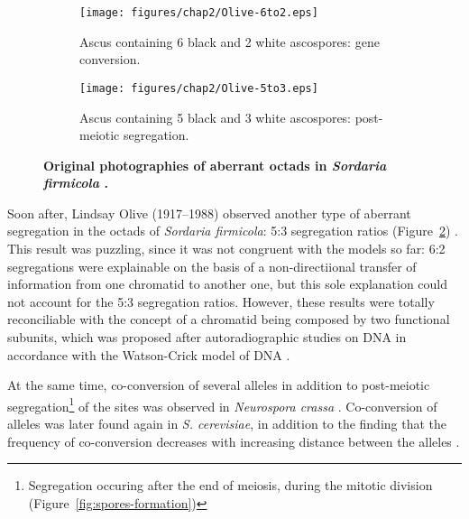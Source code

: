 \begin{figure}[h]
	\centering
	\begin{subfigure}[b]{\textwidth}
		\texttt{[image: figures/chap2/Olive-6to2.eps]}
		\caption{Ascus containing 6 black and 2 white ascospores: gene conversion.}
\label{fig:sub-olive-6to2}
	\end{subfigure}

	\begin{subfigure}[b]{\textwidth}
		\texttt{[image: figures/chap2/Olive-5to3.eps]}
		\caption{Ascus containing 5 black and 3 white ascospores: post-meiotic segregation.}
\label{fig:sub-olive-5to3}
	\end{subfigure}

	\caption[Original photographies of aberrant octads in \textit{Sordaria firmicola} \citep{olive1959aberrant}]
	{\textbf{Original photographies of aberrant octads in \textit{Sordaria firmicola} \citep{olive1959aberrant}.}
	}
\label{fig:olive-octads}
\end{figure}


Soon after, Lindsay Olive (1917--1988) observed another type of aberrant segregation in the octads of \textit{Sordaria firmicola}: 5:3 segregation ratios (Figure~\ref{fig:sub-olive-5to3}) \citep{olive1959aberrant, kitani1962genetics}.
This result was puzzling, since it was not congruent with the models so far: 6:2 segregations were explainable on the basis of a non-directiional transfer of information from one chromatid to another one, but this sole explanation could not account for the 5:3 segregation ratios. 
However, these results were totally reconciliable with the concept of a chromatid being composed by two functional subunits, which was proposed after autoradiographic studies on DNA \citep{taylor1957organization} in accordance with the Watson-Crick model of DNA \citep{watson1953molecular}.

At the same time, co-conversion of several alleles in addition to post-meiotic segregation\footnote{Segregation occuring after the end of meiosis, during the mitotic division (Figure~\ref{fig:spores-formation})} of the sites was observed in \textit{Neurospora crassa} \citep{case1964allelic}. Co-conversion of alleles was later found again in \textit{S. cerevisiae}, in addition to the finding that the frequency of co-conversion decreases with increasing distance between the alleles \citep[\cite{fogel1969informational}, reviewed by][]{orr1985fungal}. 

